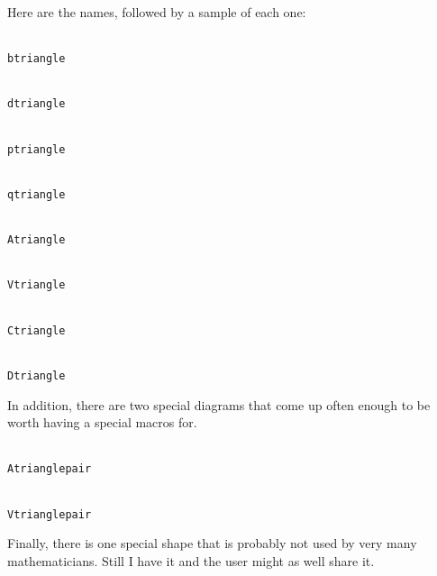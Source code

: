 {{{{{{{Here are the names, followed by a sample of each one:
\begin{list}{}{}
\item{\tt \\btriangle}\samepage
\begin{center}
\resetparms
\btriangle[A`B`C;f`g`h]
\end{center}
\pagebreak[0]
\item{\tt \\dtriangle}\samepage
\begin{center}
\resetparms
\dtriangle[A`B`C;f`g`h]
\end{center}
\pagebreak[0]
\item{\tt \\ptriangle}\samepage
\begin{center}
\resetparms
\ptriangle[A`B`C;f`g`h]
\end{center}
\pagebreak[0]
\item{\tt \\qtriangle}\samepage
\begin{center}
\resetparms
\qtriangle[A`B`C;f`g`h]
\end{center}
\pagebreak[0]
\item{\tt \\Atriangle}\samepage
\begin{center}
\resetparms
\Atriangle[A`B`C;f`g`h]
\end{center}
\pagebreak[0]
\item{\tt \\Vtriangle}\samepage
\begin{center}
\resetparms
\Vtriangle[A`B`C;f`g`h]
\end{center}
\pagebreak[0]
\item{\tt \\Ctriangle}\samepage
\begin{center}
\resetparms
\Ctriangle[A`B`C;f`g`h]
\end{center}
\pagebreak[0]
\item{\tt \\Dtriangle}\samepage
\begin{center}
\resetparms
\Dtriangle[A`B`C;f`g`h]
\end{center}
\end{list}

In addition, there are two special diagrams that come up often enough to
be worth having a special macros for.
\begin{list}{}{}
\item{\tt \\Atrianglepair}\samepage
\begin{center}
\resetparms
\Atrianglepair[A`B`C`D;f`g`h`k`l]
\end{center}
\item{\tt \\Vtrianglepair}\samepage
\begin{center}
\resetparms
\Vtrianglepair[A`B`C`D;f`g`h`k`l]
\end{center}
\end{list}
Finally, there is one special shape that is probably not used by very
many mathematicians.  Still I have it and the user might as well share
it.

}}}}}}}
